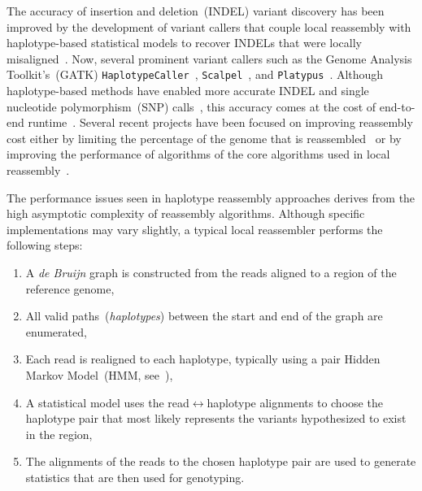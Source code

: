 \documentclass[11pt]{article}
\begin{document}
The accuracy of insertion and deletion~(INDEL) variant discovery has been improved by the development
of variant callers that couple local reassembly with haplotype-based statistical models to recover INDELs
that were locally misaligned~\cite{albers11}. Now, several prominent variant callers such as the Genome
Analysis Toolkit's~(GATK) \texttt{HaplotypeCaller}~\cite{depristo11}, \texttt{Scalpel}~\cite{narzisi14}, and
\texttt{Platypus}~\cite{rimmer14}. Although haplotype-based methods have enabled more accurate INDEL
and single nucleotide polymorphism~(SNP) calls~\cite{bao14}, this accuracy comes at the cost of
end-to-end runtime~\cite{talwalkar14}. Several recent projects have been focused on improving
reassembly cost either by limiting the percentage of the genome that is reassembled~\cite{bloniarz14} or
by improving the performance of algorithms of the core algorithms used in local
reassembly~\cite{rimmer14}.

The performance issues seen in haplotype reassembly approaches derives from the high asymptotic
complexity of reassembly algorithms. Although specific implementations may vary slightly, a typical
local reassembler performs the following steps:

\begin{enumerate}
\item A \emph{de Bruijn} graph is constructed from the reads aligned to a region of the reference genome,
\item All valid paths~(\emph{haplotypes}) between the start and end of the graph are enumerated,
\item Each read is realigned to each haplotype, typically using a pair Hidden Markov Model~(HMM,
see~\cite{durbin98}),
\item A statistical model uses the read$\leftrightarrow$haplotype alignments to choose the haplotype pair
that most likely represents the variants hypothesized to exist in the region, 
\item The alignments of the reads to the chosen haplotype pair are used to generate statistics that are
then used for genotyping.
\end{enumerate}
\end{document}

